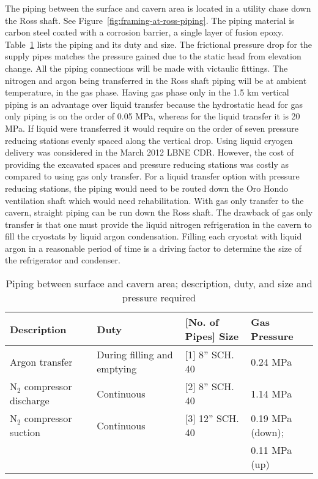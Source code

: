 The piping between the surface and cavern area is located in a utility 
chase down the Ross shaft. See Figure~\ref{fig:framing-at-ross-piping}. 
The piping material is carbon steel coated with a corrosion barrier,
a single layer of fusion epoxy. Table~\ref{table:pipelines} lists 
the piping and its duty 
and size. The frictional pressure drop for the supply pipes matches
the pressure gained due to the static head from elevation change. 
All the piping connections will be made with victaulic fittings. 
The nitrogen and argon 
being transferred in the Ross shaft piping will be at ambient 
temperature, in the gas phase. Having gas phase only in the 
1.5 km vertical piping is an advantage over liquid transfer 
because the hydrostatic head for gas only piping is on the order of
0.05 MPa, whereas for the liquid transfer it is 20 MPa. If 
liquid were transferred it would require on the order of
seven pressure reducing stations evenly spaced along the vertical drop.
Using liquid cryogen delivery was considered in the March 
2012 LBNE CDR. However, the cost of providing 
the excavated spaces and pressure reducing stations was costly 
as compared to using gas only transfer. For a liquid transfer
option with pressure reducing stations, the piping would need 
to be routed down the Oro Hondo ventilation shaft which would 
need rehabilitation. With gas 
only transfer to the cavern, straight piping can be run down 
the Ross shaft. The drawback of gas only transfer is that one 
must provide the liquid nitrogen refrigeration in the cavern 
to fill the cryostats by liquid argon condensation. Filling 
each cryostat with liquid argon in a reasonable period of 
time is a driving factor to determine the size of the 
refrigerator and condenser.

\begin{table}
\caption[Piping between surface and cavern area]{Piping between surface and cavern area; description, duty, 
and size and pressure required}
\label{table:pipelines}
\begin{tabular}[htbp]{|p{}|p{}|p{}|p{}|}
\hline
{\bf Description} & {\bf Duty} & {\bf [No. of Pipes] Size} & {\bf Gas Pressure} \\
\hline\hline
Argon transfer   & During filling and emptying & [1] 8'' SCH. 40  &  0.24 MPa\\
\hline
N$_2$ compressor discharge & Continuous & [2] 8'' SCH. 40 & 1.14 MPa \\
\hline
N$_2$ compressor suction & Continuous & [3] 12'' SCH. 40 & 0.19 MPa (down);  \\
                         &            &                        & 0.11 MPa (up) \\
\hline\end{tabular} 
\end{table}

